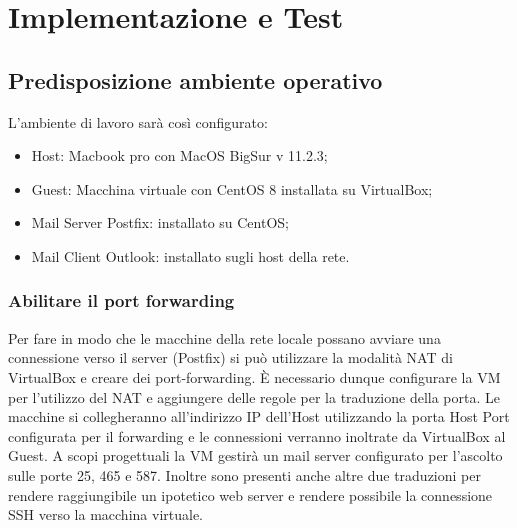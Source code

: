 \chapter{Implementazione e Test}

\section{Predisposizione ambiente operativo}

L'ambiente di lavoro sarà così configurato:

\begin{itemize}
    \item Host: Macbook pro con MacOS BigSur v 11.2.3;
    \item Guest: Macchina virtuale con CentOS 8 installata su VirtualBox;
    \item Mail Server Postfix: installato su CentOS;
    \item Mail Client Outlook: installato sugli host della rete.
\end{itemize}

\subsection{Abilitare il port forwarding}
Per fare in modo che le macchine della rete locale possano avviare una connessione
verso il server (Postfix) si può utilizzare la modalità NAT di VirtualBox e creare dei 
port-forwarding. È necessario dunque configurare la VM per l'utilizzo del NAT e aggiungere delle regole
per la traduzione della porta.
Le macchine si collegheranno all'indirizzo IP dell'Host utilizzando la porta Host Port configurata
per il forwarding e le connessioni verranno inoltrate da VirtualBox al Guest.
A scopi progettuali la VM gestirà un mail server configurato per l'ascolto sulle porte 25, 465 e
587. Inoltre sono presenti anche altre due traduzioni per rendere raggiungibile un ipotetico web server e rendere possibile
la connessione SSH verso la macchina virtuale.

\begin{table}[htp]
    \centering
    \end{table}

